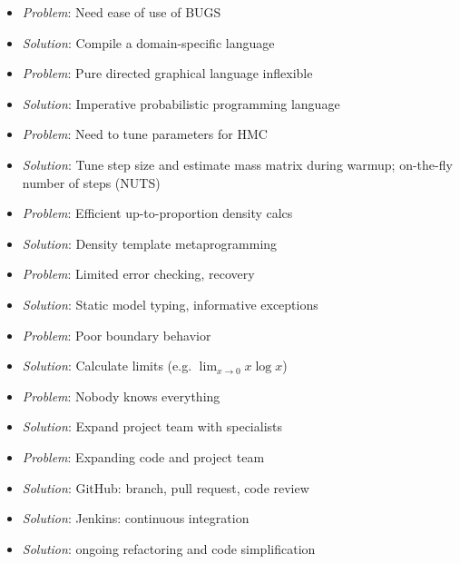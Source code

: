 \documentclass[10pt]{report}
\newcommand{\sld}[1]{\newpage{\noindent\LARGE \ \ \
    \textcolor{MidnightBlue}{\bfseries #1}}\vspace*{4pt}}
\begin{document}
\sld{Why? (cont.)}
%
\begin{itemize}
\item {\slshape Problem}:  Need ease of use of BUGS
\item {\slshape Solution}: Compile a domain-specific language
%
\vspace*{8pt}
\item {\slshape Problem}:  Pure directed graphical language inflexible
\item {\slshape Solution}: Imperative probabilistic programming
  language
\vspace*{8pt}
\item {\slshape Problem}:  Need to tune parameters for HMC
\item {\slshape Solution}: Tune step size and estimate mass matrix
  during warmup;  on-the-fly number of steps (NUTS)
%
\end{itemize}

\sld{Why? (cont.)}
\begin{itemize}
%
\vspace*{8pt}
\item {\slshape Problem}:  Efficient up-to-proportion density calcs
\item {\slshape Solution}: Density template metaprogramming 
%
\vspace*{8pt}
\item {\slshape Problem}:  Limited error checking, recovery
\item {\slshape Solution}: Static model typing, informative exceptions
%
\vspace*{8pt}
\item {\slshape Problem}:  Poor boundary behavior
\item {\slshape Solution}: Calculate limits (e.g. $\lim_{x \rightarrow
    0} x \log x$)
%
\end{itemize}

\sld{Why? (continued)}
\begin{itemize}
\item {\slshape Problem}:  Nobody knows everything
\item {\slshape Solution}: Expand project team with specialists
\vspace*{8pt}
\item {\slshape Problem}:  Expanding code and project team
\item {\slshape Solution}: GitHub: branch, pull 
  request, code review
\item {\slshape Solution}: Jenkins: continuous integration
\item {\slshape Solution}: ongoing refactoring and code simplification
%
\end{itemize}
\end{document}
